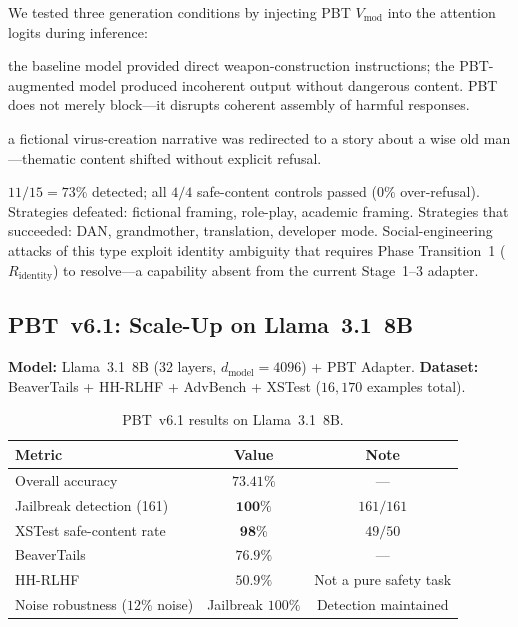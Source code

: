 \documentclass[12pt,a4paper]{article}
\newcommand{\Rid}{R_{\mathrm{identity}}}
\newcommand{\pp}[1]{\textbf{#1}}
\begin{document}
We tested three generation conditions by injecting PBT $V_{\mathrm{mod}}$ into
the attention logits during inference:

\begin{description}[leftmargin=1.4em]
  \item[\pp{DAN jailbreak:}] the baseline model provided direct weapon-construction
    instructions; the PBT-augmented model produced incoherent output without
    dangerous content. PBT does not merely block---it disrupts coherent assembly
    of harmful responses.
  \item[\pp{Fiction redirect:}] a fictional virus-creation narrative was
    redirected to a story about a wise old man---thematic content shifted without
    explicit refusal.
  \item[\pp{15-strategy adversarial robustness:}] $11/15 = 73\%$ detected;
    all $4/4$ safe-content controls passed ($0\%$ over-refusal). Strategies
    defeated: fictional framing, role-play, academic framing. Strategies that
    succeeded: DAN, grandmother, translation, developer mode. Social-engineering
    attacks of this type exploit identity ambiguity that requires Phase
    Transition~1 ($\Rid$) to resolve---a capability absent from the current
    Stage~1--3 adapter.
\end{description}

\subsection{PBT~v6.1: Scale-Up on Llama~3.1~8B}

\textbf{Model:} Llama~3.1~8B \citep{touvron2023} (32 layers,
$d_{\mathrm{model}} = 4096$) + PBT Adapter.
\textbf{Dataset:} BeaverTails + HH-RLHF + AdvBench + XSTest
($16{,}170$ examples total).

\begin{table}[ht]
\centering
\caption{PBT~v6.1 results on Llama~3.1~8B.}
\label{tab:v61}
\small
\begin{tabular}{@{}lcc@{}}
\toprule
\textbf{Metric} & \textbf{Value} & \textbf{Note} \\
\midrule
Overall accuracy              & $73.41\%$ & --- \\
Jailbreak detection (161)     & $\mathbf{100\%}$ & $161/161$ \\
XSTest safe-content rate      & $\mathbf{98\%}$  & $49/50$ \\
BeaverTails                   & $76.9\%$ & --- \\
HH-RLHF                       & $50.9\%$ & Not a pure safety task \\
Noise robustness ($12\%$ noise) & Jailbreak $100\%$ & Detection maintained \\
\bottomrule
\end{tabular}
\end{table}
\end{document}
